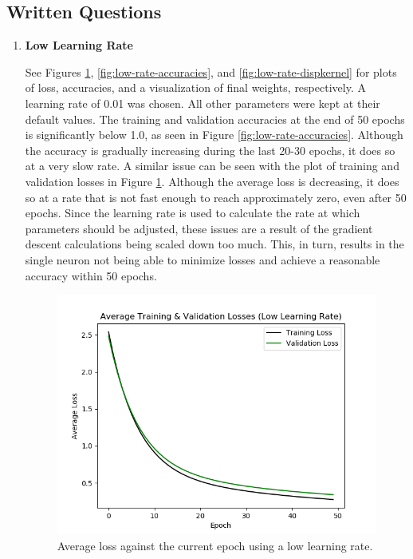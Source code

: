 \documentclass{article}
\begin{document}
\subsection{Written Questions}
\begin{enumerate}
  \item \textbf{Low Learning Rate}

        See Figures
        \ref{fig:low-rate-loss},
        \ref{fig:low-rate-accuracies}, and
        \ref{fig:low-rate-dispkernel} for plots of loss, accuracies, and
        a visualization of final weights, respectively. A learning rate of 0.01 was
        chosen. All other parameters were kept at their default values. The training
        and validation accuracies at the end of 50 epochs is significantly below 1.0,
        as seen in Figure \ref{fig:low-rate-accuracies}. Although the accuracy is
        gradually increasing during the last 20-30 epochs, it does so at a very slow
        rate. A similar issue can be seen with the plot of training and validation
        losses in Figure \ref{fig:low-rate-loss}. Although the average loss is
        decreasing, it does so at a rate that is not fast enough to reach
        approximately zero, even after 50 epochs. Since the learning rate is used to
        calculate the rate at which parameters should be adjusted, these issues are
        a result of the gradient descent calculations being scaled down too
        much. This, in turn, results in the single neuron not being able to minimize
        losses and achieve a reasonable accuracy within 50 epochs.
        \begin{figure}[ht]
          \begin{center}
            \includegraphics[width=0.7\linewidth]{figures/low-rate-loss.png}
            \caption{Average loss against the current epoch using a low learning rate.}
            \label{fig:low-rate-loss}

\end{center}
\end{figure}
\end{enumerate}
\end{document}
